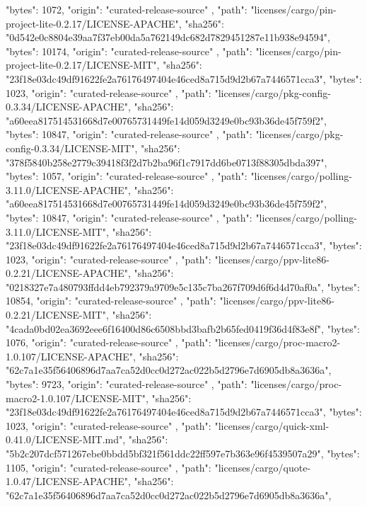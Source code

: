 {{      "bytes": 1072,
      "origin": "curated-release-source"
    },
    {
      "path": "licenses/cargo/pin-project-lite-0.2.17/LICENSE-APACHE",
      "sha256": "0d542e0c8804e39aa7f37eb00da5a762149dc682d7829451287e11b938e94594",
      "bytes": 10174,
      "origin": "curated-release-source"
    },
    {
      "path": "licenses/cargo/pin-project-lite-0.2.17/LICENSE-MIT",
      "sha256": "23f18e03dc49df91622fe2a76176497404e46ced8a715d9d2b67a7446571cca3",
      "bytes": 1023,
      "origin": "curated-release-source"
    },
    {
      "path": "licenses/cargo/pkg-config-0.3.34/LICENSE-APACHE",
      "sha256": "a60eea817514531668d7e00765731449fe14d059d3249e0bc93b36de45f759f2",
      "bytes": 10847,
      "origin": "curated-release-source"
    },
    {
      "path": "licenses/cargo/pkg-config-0.3.34/LICENSE-MIT",
      "sha256": "378f5840b258e2779c39418f3f2d7b2ba96f1c7917dd6be0713f88305dbda397",
      "bytes": 1057,
      "origin": "curated-release-source"
    },
    {
      "path": "licenses/cargo/polling-3.11.0/LICENSE-APACHE",
      "sha256": "a60eea817514531668d7e00765731449fe14d059d3249e0bc93b36de45f759f2",
      "bytes": 10847,
      "origin": "curated-release-source"
    },
    {
      "path": "licenses/cargo/polling-3.11.0/LICENSE-MIT",
      "sha256": "23f18e03dc49df91622fe2a76176497404e46ced8a715d9d2b67a7446571cca3",
      "bytes": 1023,
      "origin": "curated-release-source"
    },
    {
      "path": "licenses/cargo/ppv-lite86-0.2.21/LICENSE-APACHE",
      "sha256": "0218327e7a480793ffdd4eb792379a9709e5c135c7ba267f709d6f6d4d70af0a",
      "bytes": 10854,
      "origin": "curated-release-source"
    },
    {
      "path": "licenses/cargo/ppv-lite86-0.2.21/LICENSE-MIT",
      "sha256": "4cada0bd02ea3692eee6f16400d86c6508bbd3bafb2b65fed0419f36d4f83e8f",
      "bytes": 1076,
      "origin": "curated-release-source"
    },
    {
      "path": "licenses/cargo/proc-macro2-1.0.107/LICENSE-APACHE",
      "sha256": "62c7a1e35f56406896d7aa7ca52d0cc0d272ac022b5d2796e7d6905db8a3636a",
      "bytes": 9723,
      "origin": "curated-release-source"
    },
    {
      "path": "licenses/cargo/proc-macro2-1.0.107/LICENSE-MIT",
      "sha256": "23f18e03dc49df91622fe2a76176497404e46ced8a715d9d2b67a7446571cca3",
      "bytes": 1023,
      "origin": "curated-release-source"
    },
    {
      "path": "licenses/cargo/quick-xml-0.41.0/LICENSE-MIT.md",
      "sha256": "5b2c207dcf571267ebe0bbdd5bf321f561ddc22ff597e7b363e96f4539507a29",
      "bytes": 1105,
      "origin": "curated-release-source"
    },
    {
      "path": "licenses/cargo/quote-1.0.47/LICENSE-APACHE",
      "sha256": "62c7a1e35f56406896d7aa7ca52d0cc0d272ac022b5d2796e7d6905db8a3636a",
}}
